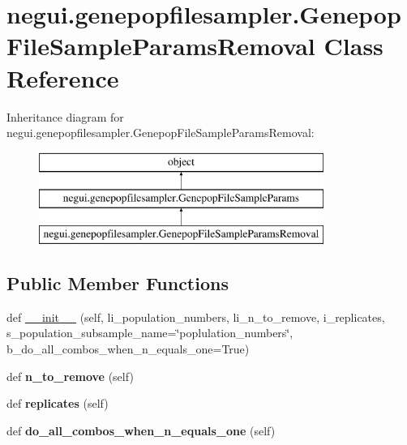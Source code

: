 \hypertarget{classnegui_1_1genepopfilesampler_1_1GenepopFileSampleParamsRemoval}{}\section{negui.\+genepopfilesampler.\+Genepop\+File\+Sample\+Params\+Removal Class Reference}
\label{classnegui_1_1genepopfilesampler_1_1GenepopFileSampleParamsRemoval}
Inheritance diagram for negui.\+genepopfilesampler.\+Genepop\+File\+Sample\+Params\+Removal\+:\begin{figure}[H]
\begin{center}
\leavevmode
\includegraphics[height=3.000000cm]{classnegui_1_1genepopfilesampler_1_1GenepopFileSampleParamsRemoval}
\end{center}
\end{figure}
\subsection*{Public Member Functions}
\begin{DoxyCompactItemize}
\item 
def \hyperlink{classnegui_1_1genepopfilesampler_1_1GenepopFileSampleParamsRemoval_a4eb7dd24a224c024d50c3bc7f99fe283}{\+\_\+\+\_\+init\+\_\+\+\_\+} (self, li\+\_\+population\+\_\+numbers, li\+\_\+n\+\_\+to\+\_\+remove, i\+\_\+replicates, s\+\_\+population\+\_\+subsample\+\_\+name=\char`\"{}poplulation\+\_\+numbers\char`\"{}, b\+\_\+do\+\_\+all\+\_\+combos\+\_\+when\+\_\+n\+\_\+equals\+\_\+one=True)
\item 
def {\bfseries n\+\_\+to\+\_\+remove} (self)\hypertarget{classnegui_1_1genepopfilesampler_1_1GenepopFileSampleParamsRemoval_a7621d89a31284b0d6d8b49598eb1860d}{}\label{classnegui_1_1genepopfilesampler_1_1GenepopFileSampleParamsRemoval_a7621d89a31284b0d6d8b49598eb1860d}

\item 
def {\bfseries replicates} (self)\hypertarget{classnegui_1_1genepopfilesampler_1_1GenepopFileSampleParamsRemoval_a78561df77c45519715a9dd14bdfd23a0}{}\label{classnegui_1_1genepopfilesampler_1_1GenepopFileSampleParamsRemoval_a78561df77c45519715a9dd14bdfd23a0}

\item 
def {\bfseries do\+\_\+all\+\_\+combos\+\_\+when\+\_\+n\+\_\+equals\+\_\+one} (self)\hypertarget{classnegui_1_1genepopfilesampler_1_1GenepopFileSampleParamsRemoval_a6999b2175c9660123c62495ff155ad08}{}\label{classnegui_1_1genepopfilesampler_1_1GenepopFileSampleParamsRemoval_a6999b2175c9660123c62495ff155ad08}

\end{DoxyCompactItemize}


